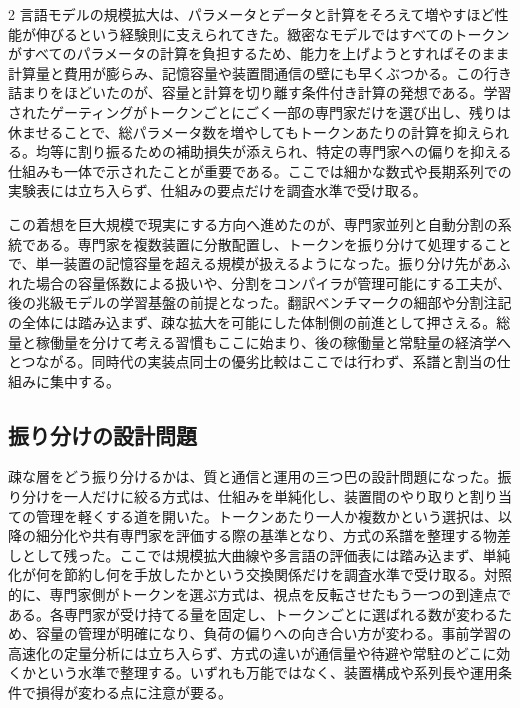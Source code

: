 \documentclass[lualatex,a4paper,10pt]{jlreq}
\begin{document}
\begin{multicols}{2}
\raggedcolumns
言語モデルの規模拡大は、パラメータとデータと計算をそろえて増やすほど性能が伸びるという経験則に支えられてきた。緻密なモデルではすべてのトークンがすべてのパラメータの計算を負担するため、能力を上げようとすればそのまま計算量と費用が膨らみ、記憶容量や装置間通信の壁にも早くぶつかる。この行き詰まりをほどいたのが、容量と計算を切り離す条件付き計算の発想である。学習されたゲーティングがトークンごとにごく一部の専門家だけを選び出し、残りは休ませることで、総パラメータ数を増やしてもトークンあたりの計算を抑えられる\autocite{shazeer2017}。均等に割り振るための補助損失が添えられ、特定の専門家への偏りを抑える仕組みも一体で示されたことが重要である。ここでは細かな数式や長期系列での実験表には立ち入らず、仕組みの要点だけを調査水準で受け取る。

この着想を巨大規模で現実にする方向へ進めたのが、専門家並列と自動分割の系統である。専門家を複数装置に分散配置し、トークンを振り分けて処理することで、単一装置の記憶容量を超える規模が扱えるようになった\autocite{gshard}。振り分け先があふれた場合の容量係数による扱いや、分割をコンパイラが管理可能にする工夫が、後の兆級モデルの学習基盤の前提となった。翻訳ベンチマークの細部や分割注記の全体には踏み込まず、疎な拡大を可能にした体制側の前進として押さえる。総量と稼働量を分けて考える習慣もここに始まり、後の稼働量と常駐量の経済学へとつながる。同時代の実装点同士の優劣比較はここでは行わず、系譜と割当の仕組みに集中する。

\subsection{振り分けの設計問題}
疎な層をどう振り分けるかは、質と通信と運用の三つ巴の設計問題になった。振り分けを一人だけに絞る方式は、仕組みを単純化し、装置間のやり取りと割り当ての管理を軽くする道を開いた\autocite{switcht}。トークンあたり一人か複数かという選択は、以降の細分化や共有専門家を評価する際の基準となり、方式の系譜を整理する物差しとして残った。ここでは規模拡大曲線や多言語の評価表には踏み込まず、単純化が何を節約し何を手放したかという交換関係だけを調査水準で受け取る。対照的に、専門家側がトークンを選ぶ方式は、視点を反転させたもう一つの到達点である\autocite{expertchoice}。各専門家が受け持てる量を固定し、トークンごとに選ばれる数が変わるため、容量の管理が明確になり、負荷の偏りへの向き合い方が変わる。事前学習の高速化の定量分析には立ち入らず、方式の違いが通信量や待避や常駐のどこに効くかという水準で整理する。いずれも万能ではなく、装置構成や系列長や運用条件で損得が変わる点に注意が要る。


\end{multicols}
\end{document}
